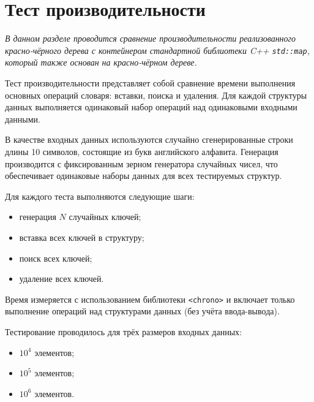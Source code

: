 \section{Тест производительности}
{\itshape В данном разделе проводится сравнение производительности реализованного красно-чёрного дерева с контейнером стандартной библиотеки C++ \texttt{std::map}, который также основан на красно-чёрном дереве.}

Тест производительности представляет собой сравнение времени выполнения основных операций словаря: вставки, поиска и удаления. Для каждой структуры данных выполняется одинаковый набор операций над одинаковыми входными данными.

В качестве входных данных используются случайно сгенерированные строки длины 10 символов, состоящие из букв английского алфавита. Генерация производится с фиксированным зерном генератора случайных чисел, что обеспечивает одинаковые наборы данных для всех тестируемых структур.

Для каждого теста выполняются следующие шаги:
\begin{itemize}
    \item генерация $N$ случайных ключей;
    \item вставка всех ключей в структуру;
    \item поиск всех ключей;
    \item удаление всех ключей.
\end{itemize}

Время измеряется с использованием библиотеки \texttt{<chrono>} и включает только выполнение операций над структурами данных (без учёта ввода-вывода).

Тестирование проводилось для трёх размеров входных данных:
\begin{itemize}
    \item $10^4$ элементов;
    \item $10^5$ элементов;
    \item $10^6$ элементов.
\end{itemize}


